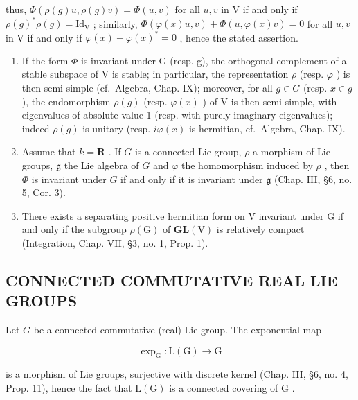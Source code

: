 thus, \(\Phi(\rho(g)u,\rho(g)v)=\Phi(u,v)\) for all \(u,v\) in V if and only if \(\rho(g)^{*}\rho(g)=\mathrm{Id}_{\mathrm{V}}\) ; similarly, \(\Phi(\varphi(x)u,v)+\Phi(u,\varphi(x)v)=0\) for all \(u,v\) in V if and only if \(\varphi(x)+\varphi(x)^{*}=0\) , hence the stated assertion.

\begin{enumerate}
\def\labelenumi{\alph{enumi})}
\setcounter{enumi}{1}
\item
  If the form \(\varPhi\) is invariant under G (resp. g), the orthogonal complement of a stable subspace of V is stable; in particular, the representation \(\rho\) (resp. \(\varphi\) ) is then semi-simple (cf.~Algebra, Chap. IX); moreover, for all \(g \in G\) (resp. \(x \in g\) ), the endomorphism \(\rho(g)\) (resp. \(\varphi(x)\) ) of V is then semi-simple, with eigenvalues of absolute value 1 (resp. with purely imaginary eigenvalues); indeed \(\rho(g)\) is unitary (resp. \(i\varphi(x)\) is hermitian, cf.~Algebra, Chap. IX).
\item
  Assume that \(k = \mathbf{R}\) . If \(G\) is a connected Lie group, \(\rho\) a morphism of Lie groups, \(\mathfrak{g}\) the Lie algebra of \(G\) and \(\varphi\) the homomorphism induced by \(\rho\) , then \(\varPhi\) is invariant under \(G\) if and only if it is invariant under \(\mathfrak{g}\) (Chap. III, §6, no. 5, Cor. 3).
\item
  There exists a separating positive hermitian form on V invariant under G if and only if the subgroup \(\rho(\mathrm{G})\) of \(\mathbf{GL}(\mathrm{V})\) is relatively compact (Integration, Chap. VII, §3, no. 1, Prop. 1).
\end{enumerate}

\subsection{CONNECTED COMMUTATIVE REAL LIE GROUPS}

Let \(G\) be a connected commutative (real) Lie group. The exponential map

\[
\exp_ {\mathrm{G}}: \mathrm{L} (\mathrm{G}) \to \mathrm{G}
\]

is a morphism of Lie groups, surjective with discrete kernel (Chap. III, §6, no. 4, Prop. 11), hence the fact that \(\mathrm{L}(\mathrm{G})\) is a connected covering of \(\mathrm{G}\) .

